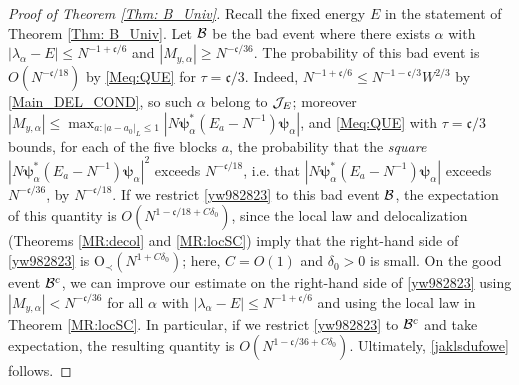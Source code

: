 \begin{proof}[Proof of Theorem \ref{Thm: B_Univ}]
Recall the fixed energy $E$ in the statement of Theorem \ref{Thm: B_Univ}. Let ${\cal B}$ be the bad event where there exists $\alpha$ with $|\lambda_{\alpha}-E|\leq N^{-1+\mathfrak{c}/6}$ and $|M_{y,\alpha}|\geq N^{-\mathfrak{c}/36}$. The probability of this bad event is $O(N^{-\mathfrak{c}/18})$ by \eqref{Meq:QUE} for $\tau=\mathfrak{c}/3$. Indeed, $N^{-1+\mathfrak{c}/6}\leq N^{-1-\mathfrak{c}/3}W^{2/3}$ by \eqref{Main_DEL_COND}, so such $\alpha$ belong to ${\cal J}_{E}$; moreover $|M_{y,\alpha}|\leq\max_{a:|a-a_{0}|_{L}\leq1}|N\boldsymbol{\psi}^{*}_{\alpha}(E_{a}-N^{-1})\boldsymbol{\psi}_{\alpha}|$, and \eqref{Meq:QUE} with $\tau=\mathfrak{c}/3$ bounds, for each of the five blocks $a$, the probability that the \emph{square} $|N\boldsymbol{\psi}^{*}_{\alpha}(E_{a}-N^{-1})\boldsymbol{\psi}_{\alpha}|^{2}$ exceeds $N^{-\mathfrak{c}/18}$, i.e. that $|N\boldsymbol{\psi}^{*}_{\alpha}(E_{a}-N^{-1})\boldsymbol{\psi}_{\alpha}|$ exceeds $N^{-\mathfrak{c}/36}$, by $N^{-\mathfrak{c}/18}$. If we restrict \eqref{yw982823} to this bad event ${\cal B}$, the expectation of this quantity is $O(N^{1-\mathfrak{c}/18+C\delta_{0}})$, since the local law and delocalization (Theorems \ref{MR:decol} and \ref{MR:locSC}) imply that the right-hand side of \eqref{yw982823} is $\mathrm{O}_{\prec}(N^{1+C\delta_{0}})$; here, $C=O(1)$ and $\delta_{0}>0$ is small. On the good event ${\cal B}^{c}$, we can improve our estimate on the right-hand side of \eqref{yw982823} using $|M_{y,\alpha}|< N^{-\mathfrak{c}/36}$ for all $\alpha$ with $|\lambda_{\alpha}-E|\leq N^{-1+\mathfrak{c}/6}$ and using the local law in Theorem \ref{MR:locSC}. In particular, if we restrict \eqref{yw982823} to ${\cal B}^{c}$ and take expectation, the resulting quantity is $O(N^{1-\mathfrak{c}/36+C\delta_{0}})$. Ultimately, \eqref{jaklsdufowe} follows.

\end{proof}
